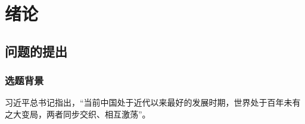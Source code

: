 \chapter*{绪论}\label{chapter_introduction}
{} 


\section{问题的提出}

\subsection{选题背景}

习近平总书记指出，“当前中国处于近代以来最好的发展时期，世界处于百年未有之大变局，两者同步交织、相互激荡”。